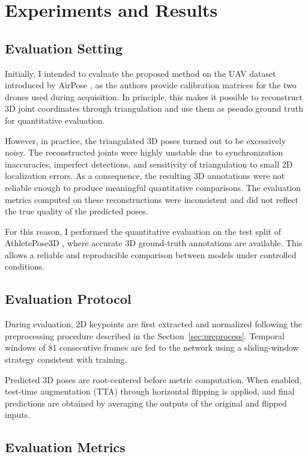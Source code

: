 \chapter{Experiments and Results}

\section{Evaluation Setting}

Initially, I intended to evaluate the proposed method on the UAV dataset introduced by AirPose \cite{saini2022airpose}, as the authors provide calibration matrices for the two drones used during acquisition. In principle, this makes 
it possible to reconstruct 3D joint coordinates through triangulation and use them as pseudo ground truth for quantitative evaluation.

However, in practice, the triangulated 3D poses turned out to be excessively noisy. The reconstructed joints were highly unstable due to synchronization inaccuracies, imperfect detections, and sensitivity of triangulation to small 
2D localization errors. As a consequence, the resulting 3D annotations were not reliable enough to produce meaningful quantitative comparisons. The evaluation metrics computed on these reconstructions were inconsistent and did not 
reflect the true quality of the predicted poses.

For this reason, I performed the quantitative evaluation on the test split of AthletePose3D \cite{yeung2025athletepose3d}, where accurate 3D ground-truth annotations are available. This allows a reliable and reproducible comparison 
between models under controlled conditions.

\section{Evaluation Protocol}

During evaluation, 2D keypoints are first extracted and normalized following the preprocessing procedure described in the Section~\ref{sec:preprocess}. Temporal windows of 81 consecutive frames are fed to the network using a 
sliding-window strategy consistent with training.

Predicted 3D poses are root-centered before metric computation. When enabled, test-time augmentation (TTA) through horizontal flipping is applied, and final predictions are obtained by averaging the outputs of the original and 
flipped inputs.

\section{Evaluation Metrics}

